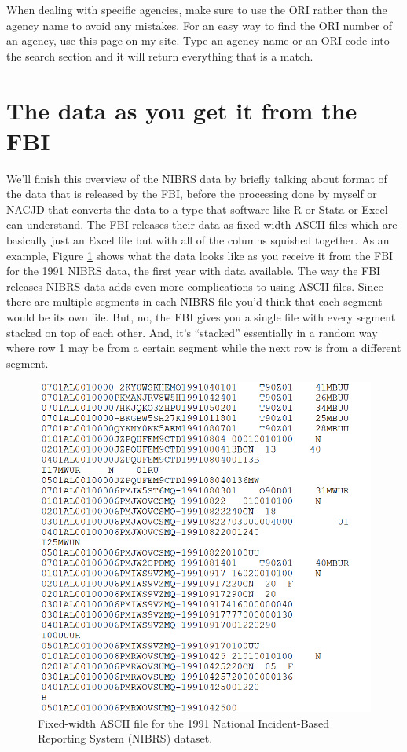 \documentclass[
  12pt,
  openany]{book}
\begin{document}
When dealing with specific agencies, make sure to use the ORI rather than the agency name to avoid any mistakes. For an easy way to find the ORI number of an agency, use \href{https://jacobdkaplan.com/crosswalk.html}{this page} on my site. Type an agency name or an ORI code into the search section and it will return everything that is a match.

\hypertarget{the-data-as-you-get-it-from-the-fbi}{%
\section{The data as you get it from the FBI}\label{the-data-as-you-get-it-from-the-fbi}}

We'll finish this overview of the NIBRS data by briefly talking about format of the data that is released by the FBI, before the processing done by myself or \href{https://www.icpsr.umich.edu/web/pages/NACJD/index.html}{NACJD} that converts the data to a type that software like R or Stata or Excel can understand. The FBI releases their data as fixed-width ASCII files which are basically just an Excel file but with all of the columns squished together. As an example, Figure \ref{fig:ascii} shows what the data looks like as you receive it from the FBI for the 1991 NIBRS data, the first year with data available. The way the FBI releases NIBRS data adds even more complications to using ASCII files. Since there are multiple segments in each NIBRS file you'd think that each segment would be its own file. But, no, the FBI gives you a single file with every segment stacked on top of each other. And, it's ``stacked'' essentially in a random way where row 1 may be from a certain segment while the next row is from a different segment.

\begin{figure}

{\centering \includegraphics[width=0.9\linewidth]{images/nibrs_ascii} 

}

\caption{Fixed-width ASCII file for the 1991 National Incident-Based Reporting System (NIBRS) dataset.}\label{fig:ascii}
\end{figure}
\end{document}
